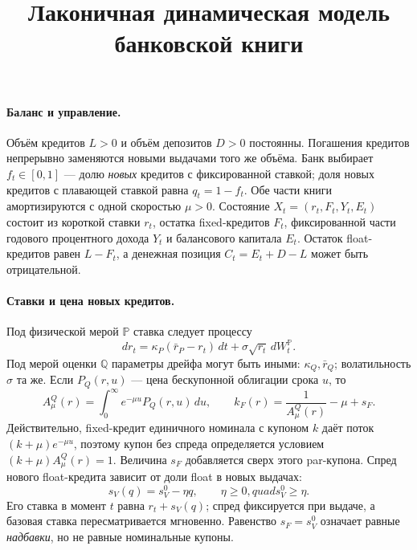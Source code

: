 \documentclass[11pt,a4paper]{article}
\title{Лаконичная динамическая модель банковской книги}
\author{}
\date{}
\begin{document}
\maketitle
\vspace{-1.5cm}

\paragraph{Баланс и управление.}
Объём кредитов $L>0$ и объём депозитов $D>0$ постоянны.
Погашения кредитов непрерывно заменяются новыми выдачами того же объёма.
Банк выбирает $f_t\in[0,1]$ --- долю \emph{новых} кредитов с фиксированной
ставкой; доля новых кредитов с плавающей ставкой равна $q_t=1-f_t$.
Обе части книги амортизируются с одной скоростью $\mu>0$.
Состояние $X_t=(r_t,F_t,Y_t,E_t)$ состоит из короткой ставки $r_t$,
остатка fixed-кредитов $F_t$, фиксированной части годового процентного
дохода $Y_t$ и балансового капитала $E_t$. Остаток float-кредитов равен
$L-F_t$, а денежная позиция $C_t=E_t+D-L$ может быть отрицательной.

\paragraph{Ставки и цена новых кредитов.}
Под физической мерой $\mathbb P$ ставка следует процессу
\begin{equation}
 dr_t=\kappa_P(\bar r_P-r_t)\,dt+\sigma\sqrt{r_t}\,dW_t^{\mathbb P}.
 \label{eq:rate}
\end{equation}
Под мерой оценки $\mathbb Q$ параметры дрейфа могут быть иными:
$\kappa_Q,\bar r_Q$; волатильность $\sigma$ та же. Если
$P_Q(r,u)$ --- цена бескупонной облигации срока $u$, то
\begin{equation}
 A_\mu^Q(r)=\int_0^\infty e^{-\mu u}P_Q(r,u)\,du,
 \qquad k_F(r)=\frac{1}{A_\mu^Q(r)}-\mu+s_F.
 \label{eq:coupon}
\end{equation}
Действительно, fixed-кредит единичного номинала с купоном $k$ даёт поток
$(k+\mu)e^{-\mu u}$, поэтому купон без спреда определяется условием
$(k+\mu)A_\mu^Q(r)=1$. Величина $s_F$ добавляется сверх этого par-купона.
Спред нового float-кредита зависит от доли float в новых выдачах:
\begin{equation}
 s_V(q)=s_V^0-\eta q,\qquad \eta\geq0,quad s_V^0\geq\eta.
 \label{eq:spread}
\end{equation}
Его ставка в момент $t$ равна $r_t+s_V(q)$; спред фиксируется при выдаче,
а базовая ставка пересматривается мгновенно. Равенство $s_F=s_V^0$
означает равные \emph{надбавки}, но не равные номинальные купоны.
\end{document}
